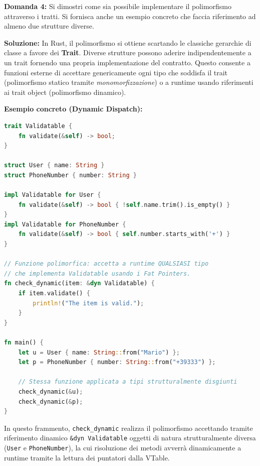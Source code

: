 \begin{exambox}
\textbf{Domanda 4:} Si dimostri come sia possibile implementare il polimorfismo attraverso i tratti. Si fornisca anche un esempio concreto che faccia riferimento ad almeno due strutture diverse.

\textbf{Soluzione:}
In Rust, il polimorfismo si ottiene scartando le classiche gerarchie di classe a favore dei \textbf{Trait}. Diverse strutture possono aderire indipendentemente a un trait fornendo una propria implementazione del contratto. Questo consente a funzioni esterne di accettare genericamente ogni tipo che soddisfa il trait (polimorfismo statico tramite \textit{monomorfizzazione}) o a runtime usando riferimenti ai trait object (polimorfismo dinamico).

\textbf{Esempio concreto (Dynamic Dispatch):}
\begin{lstlisting}[language=Rust]
trait Validatable {
    fn validate(&self) -> bool;
}

struct User { name: String }
struct PhoneNumber { number: String }

impl Validatable for User {
    fn validate(&self) -> bool { !self.name.trim().is_empty() }
}
impl Validatable for PhoneNumber {
    fn validate(&self) -> bool { self.number.starts_with('+') }
}

// Funzione polimorfica: accetta a runtime QUALSIASI tipo
// che implementa Validatable usando i Fat Pointers.
fn check_dynamic(item: &dyn Validatable) {
    if item.validate() {
        println!("The item is valid.");
    }
}

fn main() {
    let u = User { name: String::from("Mario") };
    let p = PhoneNumber { number: String::from("+39333") };
    
    // Stessa funzione applicata a tipi strutturalmente disgiunti
    check_dynamic(&u);
    check_dynamic(&p);
}
\end{lstlisting}
In questo frammento, \texttt{check\_dynamic} realizza il polimorfismo accettando tramite riferimento dinamico \texttt{\&dyn Validatable} oggetti di natura strutturalmente diversa (\texttt{User} e \texttt{PhoneNumber}), la cui risoluzione dei metodi avverrà dinamicamente a runtime tramite la lettura dei puntatori dalla VTable.
\end{exambox}
